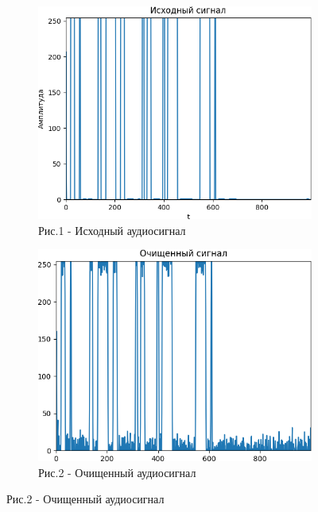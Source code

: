 \begin{figure}[H]
   \centering
   \begin{subfigure}{0.45\textwidth}
   	\centering
   	\includegraphics[width=\textwidth,height=0.7\textwidth]{media/ict/image64}
   	\caption*{Рис.1 - Исходный аудиосигнал}
   \end{subfigure}
   \begin{subfigure}{0.45\textwidth}
   	\centering
   	\includegraphics[width=\textwidth,height=0.7\textwidth]{media/ict/image65}
   	\caption*{Рис.2 - Очищенный аудиосигнал}
   \end{subfigure}
\end{figure}

